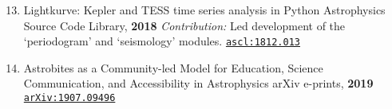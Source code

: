 \documentclass[letterpaper]{k-cv} %
\begin{document}
\textbf{\color{c1}{software publications:}}
\vspace{-0.2cm}
\begin{enumerate}
	\setcounter{enumi}{12}
	\item {}
	{Lightkurve: Kepler and TESS time series analysis in Python}
	{Astrophysics Source Code Library, \textbf{2018}}
	{\textit{Contribution:} Led development of the `periodogram' and `seismology' modules.}
	{\texttt{\href{http://ascl.net/1812.013}{ascl:1812.013}}}
\end{enumerate}


\textbf{\color{c1}{white papers:}}
\vspace{-0.2cm}
\begin{enumerate}
		\setcounter{enumi}{13}
	\item {}
	{Astrobites as a Community-led Model for Education, Science Communication, and Accessibility in Astrophysics}
	{arXiv e-prints, \textbf{2019}}
	{\texttt{\href{https://arxiv.org/abs/1907.09496}{arXiv:1907.09496}}}
\end{enumerate}
\end{document}
